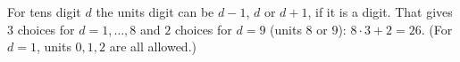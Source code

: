 For tens digit $d$ the units digit can be $d-1$, $d$ or $d+1$, if it is a digit. That gives $3$ choices for $d=1,\dots,8$ and $2$ choices for $d=9$ (units $8$ or $9$): $8\cdot3+2=\boxed{26}$. (For $d=1$, units $0,1,2$ are all allowed.)
